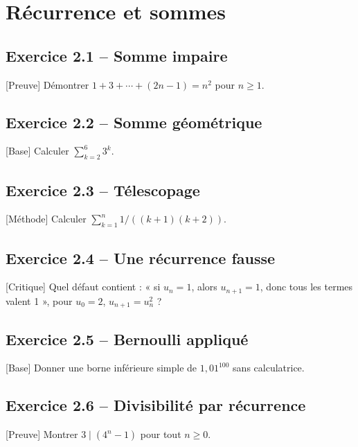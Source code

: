 \chapter{Récurrence et sommes}
\section*{Exercice 2.1 -- Somme impaire}
[Preuve] Démontrer $1+3+\cdots+(2n-1)=n^2$ pour $n\ge1$.

\section*{Exercice 2.2 -- Somme géométrique}
[Base] Calculer $\sum_{k=2}^6 3^k$.

\section*{Exercice 2.3 -- Télescopage}
[Méthode] Calculer $\sum_{k=1}^n1/((k+1)(k+2))$.

\section*{Exercice 2.4 -- Une récurrence fausse}
[Critique] Quel défaut contient : « si $u_n=1$, alors $u_{n+1}=1$, donc tous les termes valent 1 », pour $u_0=2$, $u_{n+1}=u_n^2$ ?

\section*{Exercice 2.5 -- Bernoulli appliqué}
[Base] Donner une borne inférieure simple de $1{,}01^{100}$ sans calculatrice.

\section*{Exercice 2.6 -- Divisibilité par récurrence}
[Preuve] Montrer $3\mid(4^n-1)$ pour tout $n\ge0$.
